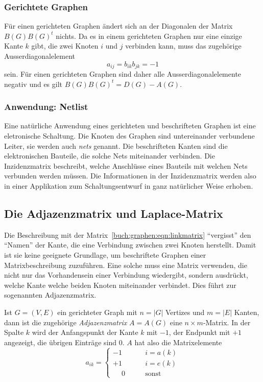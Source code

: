 \subsubsection{Gerichtete Graphen}
Für einen gerichteten Graphen ändert sich an der Diagonalen
der Matrix $B(G)B(G)^t$ nichts.
Da es in einem gerichteten Graphen nur eine einzige Kante $k$ gibt, die zwei
Knoten $i$ und $j$ verbinden kann, muss das zugehörige 
Ausserdiagonalelement
\[
a_{ij}
=b_{ik}b_{jk}
=
-1
\]
sein.
Für einen gerichteten Graphen sind daher alle Ausserdiagonalelemente
negativ und es gilt $B(G)B(G)^t = D(G)-A(G)$.

\subsubsection{Anwendung: Netlist}
Eine natürliche Anwendung eines gerichteten und beschrifteten Graphen
ist eine eletronische Schaltung.
Die Knoten des Graphen sind untereinander verbundene Leiter, sie werden
auch {\em nets} genannt. 
Die beschrifteten Kanten sind die elektronischen Bauteile, die solche
Nets miteinander verbinden.
Die Inzidenzmatrix beschreibt, welche Anschlüsse eines Bauteils mit
welchen Nets verbunden werden müssen.
Die Informationen in der Inzidenzmatrix werden also in einer
Applikation zum Schaltungsentwurf in ganz natürlicher Weise erhoben.

\subsection{Die Adjazenzmatrix und Laplace-Matrix
\label{subsection:adjazenz-und-laplace-matrix}}
Die Beschreibung mit der Matrix~\eqref{buch:graphen:eqn:linkmatrix}
``vergisst'' den ``Namen'' der Kante, die eine Verbindung zwischen zwei
Knoten herstellt.
Damit ist sie keine geeignete Grundlage, um beschriftete Graphen einer
Matrixbeschreibung zuzuführen.
Eine solche muss eine Matrix verwenden, die nicht nur das Vorhandensein einer
Verbindung wiedergibt, sondern ausdrückt, welche Kante welche beiden
Knoten miteinander verbindet.
Dies führt zur sogenannten Adjazenzmatrix.

\begin{definition}
\label{buch:def:adjazenz-matrix}
Ist $G=(V,E)$ ein gerichteter Graph mit $n=|G|$ Vertizes und $m=|E|$ Kanten,
dann ist die zugehörige {\em Adjazenzmatrix} $A=A(G)$ eine $n\times m$-Matrix.
In der Spalte $k$ wird der Anfangspunkt der Kante $k$ mit $-1$, der Endpunkt
mit $+1$ angezeigt, die übrigen Einträge sind $0$.
$A$ hat also die Matrixelemente
\begin{equation}
a_{ik}
=
\begin{cases}
-1&\qquad i=a(k)\\
+1&\qquad i=e(k)\\
\phantom{+}0&\qquad\text{sonst}
\end{cases}
\label{buch:eqn:ajazenz-matrix}
\end{equation}
\end{definition}

